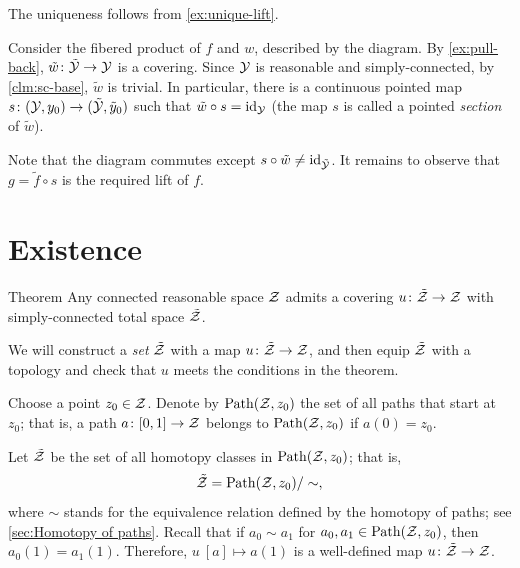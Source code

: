 {

\begin{figure}
\vskip-6mm
\centering
{}
\end{figure}

 The uniqueness follows from \ref{ex:unique-lift}.


Consider the fibered product of $f$ and $w$, described by the diagram.
By \ref{ex:pull-back}, $\tilde w\:\tilde{\c{Y}}\z\to \c{Y}$ is a covering.
Since $\mathcal{Y}$ is reasonable and simply-connected, by \ref{clm:sc-base}, $\tilde w$ is trivial.
In particular, there is a continuous pointed map $s\:(\c{Y},y_0)\z\to (\tilde{\c{Y}},\tilde y_0)$ such that $\tilde w\circ s=\mathrm{id}_{\mathcal{Y}}$ (the map $s$ is called a pointed \emph{section} of $\tilde w$).

}

Note that the diagram commutes except $s\circ \tilde w\ne \mathrm{id}_{\tilde{\mathcal{Y}}}$.
It remains to observe that $g=\tilde f\circ s$ is the required lift of $f$.
\qeds

\section{Existence}

\begin{thm}{Theorem}\label{thm:u-cover-exist}
Any connected reasonable space $\mathcal{Z}$ admits a covering $u\colon\tilde{\mathcal{Z}}\to\mathcal{Z}$ with simply-connected total space $\tilde{\mathcal{Z}}$.
\end{thm}

We will construct a \textit{set} $\tilde{\mathcal{Z}}$ with a map $u\colon\tilde{\mathcal{Z}}\to\mathcal{Z}$, and then equip $\tilde{\mathcal{Z}}$ with a topology and check that $u$ meets the conditions in the theorem.

Choose a point $z_0\in \mathcal{Z}$.
Denote by $\mathrm{Path}(\mathcal{Z},z_0)$ the set of all paths that start at $z_0$;
that is, a path $a\colon[0,1]\to \mathcal{Z}$ belongs to $\mathrm{Path}(\mathcal{Z},z_0)$ if $a(0)=z_0$.

Let $\tilde{\mathcal{Z}}$ be the set of all homotopy classes in $\mathrm{Path}(\mathcal{Z},z_0)$; that is,
\[\tilde{\mathcal{Z}}=\mathrm{Path}(\mathcal{Z},z_0)/\sim,\]
where $\sim$ stands for the equivalence relation defined by the homotopy of paths;
see \ref{sec:Homotopy of paths}.
Recall that if $a_0\sim a_1$ for $a_0, a_1\z\in \Path(\c{Z},z_0)$, then
$a_0(1)=a_1(1)$.
Therefore, $u\:[a]\mapsto a(1)$ is a well-defined map $u\colon\tilde{\mathcal{Z}}\to\mathcal{Z}$.


